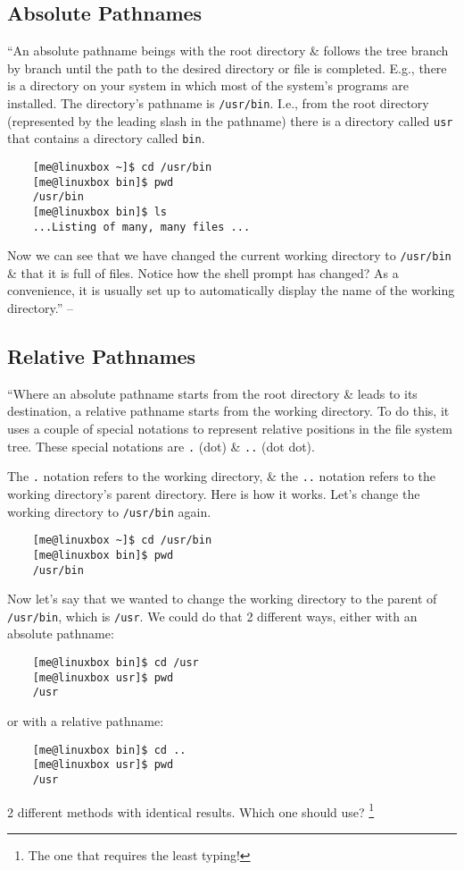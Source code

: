 \documentclass[oneside]{book}
\numberwithin{equation}{section}
\begin{document}
\subsection{Absolute Pathnames}
``An absolute pathname beings with the root directory \& follows the tree branch by branch until the path to the desired directory or file is completed. E.g., there is a directory on your system in which most of the system's programs are installed. The directory's pathname is \texttt{/usr/bin}. I.e., from the root directory (represented by the leading slash in the pathname) there is a directory called \texttt{usr} that contains a directory called \texttt{bin}.
\begin{verbatim}
	[me@linuxbox ~]$ cd /usr/bin
	[me@linuxbox bin]$ pwd
	/usr/bin
	[me@linuxbox bin]$ ls
	...Listing of many, many files ...
\end{verbatim}
Now we can see that we have changed the current working directory to \texttt{/usr/bin} \& that it is full of files. Notice how the shell prompt has changed? As a convenience, it is usually set up to automatically display the name of the working directory.'' -- \cite[p. 46]{Shotts2019}

\subsection{Relative Pathnames}
``Where an absolute pathname starts from the root directory \& leads to its destination, a relative pathname starts from the working directory. To do this, it uses a couple of special notations to represent relative positions in the file system tree. These special notations are \texttt{.} (dot) \& \texttt{..} (dot dot).

The \texttt{.} notation refers to the working directory, \& the \texttt{..} notation refers to the working directory's parent directory. Here is how it works. Let's change the working directory to \texttt{/usr/bin} again.
\begin{verbatim}
	[me@linuxbox ~]$ cd /usr/bin
	[me@linuxbox bin]$ pwd
	/usr/bin
\end{verbatim}
Now let's say that we wanted to change the working directory to the parent of \texttt{/usr/bin}, which is \texttt{/usr}. We could do that 2 different ways, either with an absolute pathname:
\begin{verbatim}
	[me@linuxbox bin]$ cd /usr
	[me@linuxbox usr]$ pwd
	/usr
\end{verbatim}
or with a relative pathname:
\begin{verbatim}
	[me@linuxbox bin]$ cd ..
	[me@linuxbox usr]$ pwd
	/usr
\end{verbatim}
2 different methods with identical results. Which one should use? \footnote{The one that requires the least typing!}
\end{document}

